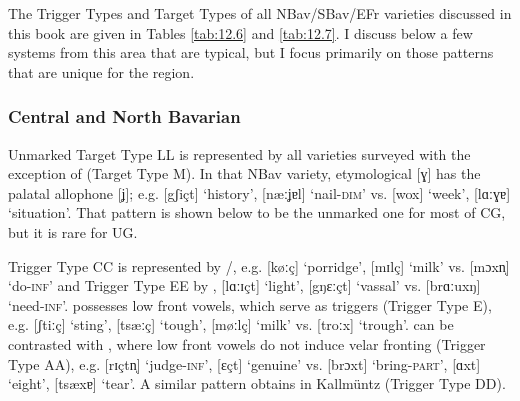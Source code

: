 The Trigger Types and Target Types of all NBav/SBav/EFr varieties discussed in this book are given in Tables \ref{tab:12.6} and \ref{tab:12.7}. I discuss below a few systems from this area that are typical, but I focus primarily on those patterns that are unique for the region.

\subsubsection{Central and North Bavarian}
Unmarked Target Type LL is represented by all varieties surveyed with the exception of  (Target Type M). In that NBav variety, etymological [ɣ] has the palatal allophone [ʝ]; e.g. [gʃiçt] ‘history’, [næːʝɐl] ‘nail-\textsc{dim}’ vs. [wox] ‘week’, [lɑːɣɐ] ‘situation’. That pattern is shown below to be the unmarked one for most of CG, but it is rare for UG.

Trigger Type CC is represented by /, e.g. [køːç] ‘porridge’, [mɪlç] ‘milk’ vs. [mɔxn̩] ‘do-\textsc{inf}’ and Trigger Type EE by ,  [lɑːɪçt] ‘light’, [gŋɛːçt] ‘vassal’ vs. [brɑːuxŋ] ‘need-\textsc{inf}’.  possesses low front vowels, which serve as triggers (Trigger Type E), e.g. [ʃtiːç] ‘sting’, [tsæːç] ‘tough’, [møːlç] ‘milk’ vs. [troːx] ‘trough’.  can be contrasted with , where low front vowels do not induce velar fronting (Trigger Type AA), e.g. [rɪçtn̩] ‘judge-\textsc{inf}’, [ɛçt] ‘genuine’ vs. [brɔxt] ‘bring-\textsc{part}’, [ɑxt] ‘eight’, [tsæxɐ] ‘tear’. A similar pattern obtains in Kallmüntz (Trigger Type DD).

